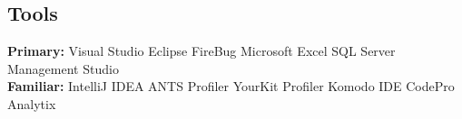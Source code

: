 \documentclass[letterpaper]{deedy-resume} %
\begin{document}
\begin{minipage}[t]{0.33\textwidth}
\sectionspace %

\subsection{Tools}

\textbf{Primary:}\newline 
Visual Studio \textbullet{} Eclipse \textbullet{} FireBug \newline Microsoft Excel \newline SQL Server Management Studio \\ 
\textbf{Familiar:}\newline 
IntelliJ IDEA \textbullet{} ANTS Profiler \newline YourKit Profiler \textbullet{} Komodo IDE \newline CodePro Analytix \\

\sectionspace %



\end{minipage} %
\hfill
%
%
\end{document}
